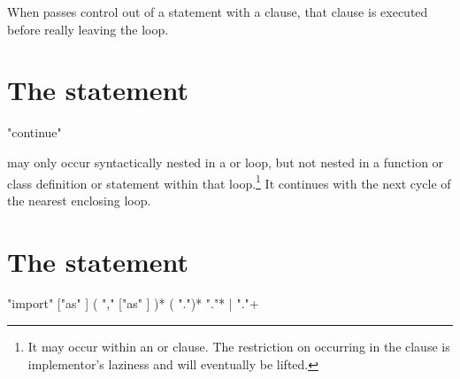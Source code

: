 When  passes control out of a  statement
with a  clause, that  clause is executed
before really leaving the loop.


\section{The  statement \label{continue}}

\begin{productionlist}
             {"continue"}
\end{productionlist}

 may only occur syntactically nested in a  or
 loop, but not nested in a function or class definition or
 statement within that loop.\footnote{It may
occur within an  or  clause.  The
restriction on occurring in the  clause is implementor's
laziness and will eventually be lifted.}
It continues with the next cycle of the nearest enclosing loop.


\section{The  statement \label{import}}

\begin{productionlist}
             {"import"  ["as" ]
                ( ","  ["as" ] )*}
             {( ".")* }
             {"."*  | "."+}
             {}
\end{productionlist}

